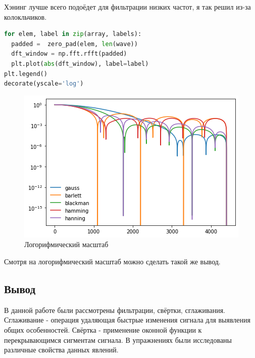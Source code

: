Хэнинг лучше всего подоёдет для фильтрации низких частот, я так решил из-за колокльчиков.

\begin{lstlisting}[language=Python]
for elem, label in zip(array, labels):
  padded =  zero_pad(elem, len(wave))
  dft_window = np.fft.rfft(padded)
  plt.plot(abs(dft_window), label=label)
plt.legend()
decorate(yscale='log')
\end{lstlisting}
\begin{figure}[H]
	\begin{center}
		\includegraphics[scale=1]{fig/lab08/lab08_25_0.png}
		\caption{Логорифмический масштаб}
	\end{center}
\end{figure}

Смотря на логорифмический масштаб можно сделать такой же вывод.

\subsection{Вывод}

В данной работе были рассмотрены фильтрации, свёртки, сглаживания. Сглаживание - операция удаляющая быстрые изменения сигнала для выявления общих особенностей. Свёртка - применение оконной функции к перекрывающимся сигментам сигнала. В упражнениях были исследованы различные свойства данных явлений.